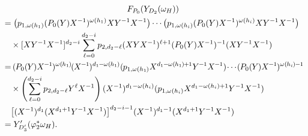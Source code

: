 \documentclass[10pt]{amsart}
\theoremstyle{definition}
\newcommand*{\mk}{\mkern -1mu}
\newcommand*{\Mk}{\mkern -2mu}
\begin{document}
\begin{multline*}
 F_{P_0}(Y_{D_2}(\omega_H))\\
\begin{aligned}
 &=\big(p_{1,\omega(h_1)}(P_0(Y)X^{-1})^{\omega(h_1)}XY^{-1}X^{-1}\big)\cdots\big(p_{1,\omega(h_i)}(P_0(Y)X^{-1})^{\omega(h_i)}XY^{-1}X^{-1}\big)\\
 &\quad\times[XY^{-1}X^{-1}]^{d_2-i}\sum\limits_{\ell=0}^{d_2-i} p_{2,d_2-\ell}(XYX^{-1})^{\ell+1}(P_0(Y)X^{-1})^{-1}(XY^{-1}X^{-1})\\
 &=\Mk(\mk P_0(\mk Y\mk )X^{\mk -\mk 1}\mk )^{\omega(\mk h_1\mk ) }\Mk (\mk X^{\mk -\mk 1}\mk )^{d_1\mk -\mk \omega(\mk h_1\mk )}(\mk p_{1,\omega(h_1\mk )}X^{d_1\mk -\mk \omega(\mk h_1\mk )\mk +\mk 1}Y^{\mk -\mk 1}X^{\mk -\mk 1})\Mk \cdots\Mk (\mk P_0(\mk Y\mk )X^{\mk -\mk 1}\mk )^{\omega(\mk h_i\mk )\mk -\mk 1}\\
 &\quad\times\left(\sum\limits_{\ell=0}^{d_2-i} p_{2,d_2-\ell} Y^\ell X^{-1}\right)(X^{-1})^{d_1-\omega(h_i)}(p_{1,\omega(h_i)}X^{d_1-\omega(h_i)+1}Y^{-1}X^{-1})\\
 &\quad\big[(X^{-1})^{d_1}(X^{d_1+1}Y^{-1}X^{-1})\big]^{d_2-i-1}(X^{-1})^{d_1-1}(X^{d_1+1}Y^{-1}X^{-1})\\
 &=Y'_{D'_3}(\varphi^*_2\omega_H).
\end{aligned}
\end{multline*}
\end{document}
